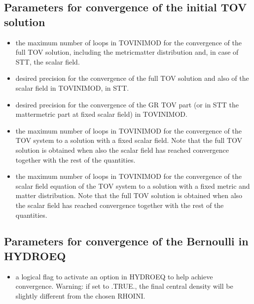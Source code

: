 \documentclass[letterpaper,10pt,english]{sphinxmanual}
\begin{document}
\subsection{Parameters for convergence of the initial TOV solution}
\label{\detokenize{user_params:parameters-for-convergence-of-the-initial-tov-solution}}\begin{itemize}
\item {} 
\sphinxAtStartPar
{} \sphinxhyphen{} the maximum number of loops in TOVINIMOD for the convergence of the full TOV solution, including the metric\sphinxhyphen{}matter distribution and, in case of STT, the scalar field.


\item {} 
\sphinxAtStartPar
{} \sphinxhyphen{} desired precision for the convergence of the full TOV solution and also of the scalar field in TOVINIMOD, in STT.


\item {} 
\sphinxAtStartPar
{} \sphinxhyphen{} desired precision for the convergence of the GR TOV part (or in STT the matter\sphinxhyphen{}metric part at fixed scalar field) in TOVINIMOD.


\item {} 
\sphinxAtStartPar
{} \sphinxhyphen{} the maximum number of loops in TOVINIMOD for the convergence of the TOV system to a solution with a fixed scalar field. Note that the full TOV solution is obtained when also the scalar field has reached convergence together with the rest of the quantities.


\item {} 
\sphinxAtStartPar
{} \sphinxhyphen{} the maximum number of loops in TOVINIMOD for the convergence of the scalar field equation of the TOV system to a solution with a fixed metric and matter distribution. Note that the full TOV solution is obtained when also the scalar field has reached convergence together with the rest of the quantities.


\end{itemize}


\subsection{Parameters for convergence of the Bernoulli in HYDROEQ}
\label{\detokenize{user_params:parameters-for-convergence-of-the-bernoulli-in-hydroeq}}\begin{itemize}
\item {} 
\sphinxAtStartPar
{} \sphinxhyphen{} a logical flag to activate an option in HYDROEQ to help achieve convergence. Warning: if set to .TRUE., the final central density will be slightly different from the chosen RHOINI.

\end{itemize}
\end{document}
